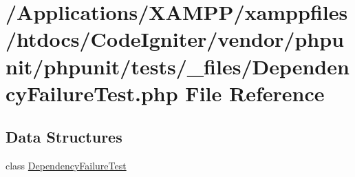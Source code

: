 \hypertarget{_dependency_failure_test_8php}{}\section{/\+Applications/\+X\+A\+M\+P\+P/xamppfiles/htdocs/\+Code\+Igniter/vendor/phpunit/phpunit/tests/\+\_\+files/\+Dependency\+Failure\+Test.php File Reference}
\label{_dependency_failure_test_8php}
\subsection*{Data Structures}
\begin{DoxyCompactItemize}
\item 
class \mbox{\hyperlink{class_dependency_failure_test}{Dependency\+Failure\+Test}}
\end{DoxyCompactItemize}
